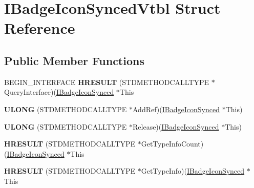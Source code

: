 \hypertarget{struct_i_badge_icon_synced_vtbl}{\section{I\-Badge\-Icon\-Synced\-Vtbl Struct Reference}
\label{struct_i_badge_icon_synced_vtbl}
}
\subsection*{Public Member Functions}
\begin{DoxyCompactItemize}
\item 
\hypertarget{struct_i_badge_icon_synced_vtbl_aa3af36bc9f91f7da3b4b27ed5016c09b}{B\-E\-G\-I\-N\-\_\-\-I\-N\-T\-E\-R\-F\-A\-C\-E {\bfseries H\-R\-E\-S\-U\-L\-T} (S\-T\-D\-M\-E\-T\-H\-O\-D\-C\-A\-L\-L\-T\-Y\-P\-E $\ast$Query\-Interface)(\hyperlink{interface_i_badge_icon_synced}{I\-Badge\-Icon\-Synced} $\ast$This}\label{struct_i_badge_icon_synced_vtbl_aa3af36bc9f91f7da3b4b27ed5016c09b}

\item 
\hypertarget{struct_i_badge_icon_synced_vtbl_a0a5b9360227667c67ab83c5ce77fd58e}{{\bfseries U\-L\-O\-N\-G} (S\-T\-D\-M\-E\-T\-H\-O\-D\-C\-A\-L\-L\-T\-Y\-P\-E $\ast$Add\-Ref)(\hyperlink{interface_i_badge_icon_synced}{I\-Badge\-Icon\-Synced} $\ast$This)}\label{struct_i_badge_icon_synced_vtbl_a0a5b9360227667c67ab83c5ce77fd58e}

\item 
\hypertarget{struct_i_badge_icon_synced_vtbl_a9a5209e140585dc310cc7122ab681edd}{{\bfseries U\-L\-O\-N\-G} (S\-T\-D\-M\-E\-T\-H\-O\-D\-C\-A\-L\-L\-T\-Y\-P\-E $\ast$Release)(\hyperlink{interface_i_badge_icon_synced}{I\-Badge\-Icon\-Synced} $\ast$This)}\label{struct_i_badge_icon_synced_vtbl_a9a5209e140585dc310cc7122ab681edd}

\item 
\hypertarget{struct_i_badge_icon_synced_vtbl_a4209cacd06e0d30dfdb98f6490cc1680}{{\bfseries H\-R\-E\-S\-U\-L\-T} (S\-T\-D\-M\-E\-T\-H\-O\-D\-C\-A\-L\-L\-T\-Y\-P\-E $\ast$Get\-Type\-Info\-Count)(\hyperlink{interface_i_badge_icon_synced}{I\-Badge\-Icon\-Synced} $\ast$This}\label{struct_i_badge_icon_synced_vtbl_a4209cacd06e0d30dfdb98f6490cc1680}

\item 
\hypertarget{struct_i_badge_icon_synced_vtbl_a59a6fcb1fe4a1412477b8ccb61e43f55}{{\bfseries H\-R\-E\-S\-U\-L\-T} (S\-T\-D\-M\-E\-T\-H\-O\-D\-C\-A\-L\-L\-T\-Y\-P\-E $\ast$Get\-Type\-Info)(\hyperlink{interface_i_badge_icon_synced}{I\-Badge\-Icon\-Synced} $\ast$This}\label{struct_i_badge_icon_synced_vtbl_a59a6fcb1fe4a1412477b8ccb61e43f55}


\end{DoxyCompactItemize}
